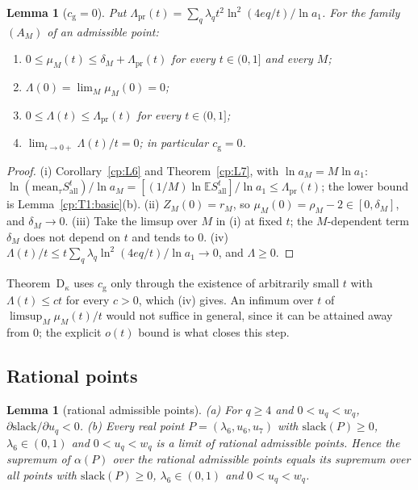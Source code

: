 \documentclass[11pt]{article}
\newtheorem{lemma}[theorem]{Lemma}
\theoremstyle{definition}
\theoremstyle{remark}
\newcommand{\Lam}{\Lambda}                    %
\newcommand{\Lampr}{\Lambda_{\mathrm{pr}}}    %
\newcommand{\cg}{c_{\mathrm g}}               %
\newcommand{\ThmDk}{Theorem~D\texorpdfstring{\ensuremath{_\kappa}}{\_kappa}}     %
\newcommand{\slack}{\mathrm{slack}}           %
\newcommand{\Sall}{S_{\mathrm{all}}}          %
\begin{document}
\begin{lemma}[$\cg=0$]\label{cp:L8}
Put $\Lampr(t)=\sum_q\lambda_qt^2\ln^2(4eq/t)/\ln a_1$. For the family $(A_M)$ of an admissible point:
\begin{enumerate}[label=(\roman*)]
\item $0\le\mu_M(t)\le\delta_M+\Lampr(t)$ for every $t\in(0,1]$ and every $M$;
\item $\Lam(0)=\lim_M\mu_M(0)=0$;
\item $0\le\Lam(t)\le\Lampr(t)$ for every $t\in(0,1]$;
\item $\lim_{t\to0+}\Lam(t)/t=0$; in particular $\cg=0$.
\end{enumerate}
\end{lemma}

\begin{proof}
(i) Corollary~\ref{cp:L6} and Theorem~\ref{cp:L7}, with $\ln a_M=M\ln a_1$: $\ln(\mathrm{mean}_\tau\Sall^t)/\ln a_M=[(1/M)\ln\mathbb E\Sall^t]/\ln a_1\le\Lampr(t)$; the lower bound is Lemma~\ref{cp:T1:basic}(b). (ii) $Z_M(0)=r_M$, so $\mu_M(0)=\rho_M-2\in[0,\delta_M]$, and $\delta_M\to0$. (iii) Take the limsup over $M$ in (i) at fixed $t$; the $M$-dependent term $\delta_M$ does not depend on $t$ and tends to $0$. (iv) $\Lam(t)/t\le t\sum_q\lambda_q\ln^2(4eq/t)/\ln a_1\to0$, and $\Lam\ge0$.
\end{proof}

\ThmDk{} uses $\cg$ only through the existence of arbitrarily small $t$ with $\Lam(t)\le ct$ for every $c>0$, which (iv) gives. An infimum over $t$ of $\limsup_M\mu_M(t)/t$ would not suffice in general, since it can be attained away from $0$; the explicit $o(t)$ bound is what closes this step.

\subsection{Rational points}\label{cp:sec:rational}

\begin{lemma}[rational admissible points]\label{cp:L9}
(a) For $q\ge4$ and $0<u_q<w_q$, $\partial\slack/\partial u_q<0$. (b) Every real point $P=(\lambda_6,u_6,u_7)$ with $\slack(P)\ge0$, $\lambda_6\in(0,1)$ and $0<u_q<w_q$ is a limit of rational admissible points. Hence the supremum of $\alpha(P)$ over the rational admissible points equals its supremum over all points with $\slack(P)\ge0$, $\lambda_6\in(0,1)$ and $0<u_q<w_q$.
\end{lemma}
\end{document}

